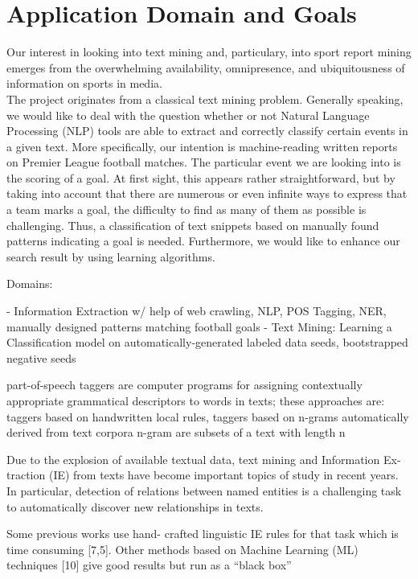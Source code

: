 \documentclass[11pt,titlepage,oneside,openany]{book}
\begin{document}
\section{Application Domain and Goals}
Our interest in looking into text mining and, particulary, into sport report mining emerges from the overwhelming availability, omnipresence, and ubiquitousness of information on sports in media. \\
The project originates from a classical text mining problem. Generally speaking, we would like to deal with the question whether or not Natural Language Processing (NLP) tools are able to extract and correctly classify certain events in a given text. More specifically, our intention is machine-reading written reports on Premier League football matches. The particular event we are looking into is the scoring of a goal. At first sight, this appears rather straightforward, but by taking into account that there are numerous or even infinite ways to express that a team marks a goal, the difficulty to find as many of them as possible is challenging. Thus, a classification of text snippets based on manually found patterns indicating a goal is needed. Furthermore, we would like to enhance our search result by using learning algorithms.  


Domains:

- Information Extraction w/ help of web crawling, NLP, POS Tagging, NER, manually designed patterns matching football goals
- Text Mining: Learning a Classification model on automatically-generated labeled data seeds, bootstrapped negative seeds	

part-of-speech taggers are computer programs for assigning contextually appropriate grammatical descriptors to words in texts;
these approaches are: taggers based on handwritten local rules, taggers based on n-grams automatically derived from text corpora   n-gram are subsets of a text with length n \citep[p.219]{Voutilainen2005} 

Due to the explosion of available textual data, text mining and Information Ex-
traction (IE) from texts have become important topics of study in recent years.
In particular, detection of relations between named entities is a challenging task
to automatically discover new relationships in texts. \citep[p.1]{Cellier2010}

Some previous works use hand-
crafted linguistic IE rules for that task which is time consuming [7,5]. Other
methods based on Machine Learning (ML) techniques [10] give good results but
run as a “black box” \citep[p.1]{Cellier2010}
\end{document}
